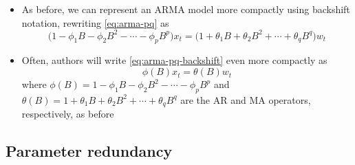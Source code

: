 \documentclass{article}
\begin{document}
\begin{itemize}
\item As before, we can represent an ARMA model more compactly using backshift 
  notation, rewriting \eqref{eq:arma-pq} as
  \begin{equation}
  \label{eq:arma-pq-backshift}
  \Big(1 - \phi_1 B - \phi_2 B^2 - \cdots - \phi_p B^p \Big) x_t = 
  \Big(1 + \theta_1 B + \theta_2 B^2 + \cdots + \theta_q B^q \Big) w_t   
  \end{equation}

\item Often, authors will write \eqref{eq:arma-pq-backshift} even more compactly
  as    
  \begin{equation}
  \label{eq:arma-pq-operator}
  \phi(B) x_t = \theta(B) w_t  
  \end{equation}
  where  $\phi(B) = 1 - \phi_1 B - \phi_2 B^2 - \cdots - \phi_p B^p$ and
  $\theta(B) = 1 + \theta_1 B + \theta_2 B^2 + \cdots + \theta_q B^q$ are the AR
  and MA operators, respectively, as before 
\end{itemize}

\subsection{Parameter redundancy}
\end{document}

